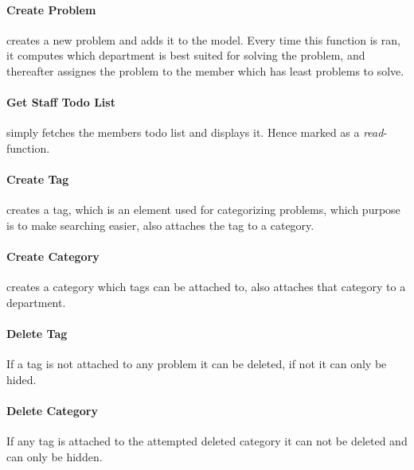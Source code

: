 \paragraph{Create Problem} creates a new problem and adds it to the model. Every time this function is ran, it computes which department is best suited for solving the problem, and thereafter assignes the problem to the \astaff[] member which has least problems to solve.  


\paragraph{Get Staff Todo List} simply fetches the \astaff[] members todo list and displays it. Hence marked as a \textit{read}-function. 

\paragraph{Create Tag} creates a tag, which is an element used for categorizing problems, which purpose is to make searching easier, also attaches the tag to a category. 

\paragraph{Create Category} creates a category which tags can be attached to, also attaches that category to a department. 

\paragraph{Delete Tag} If a tag is not attached to any problem it can be deleted, if not it can only be hided. 

\paragraph{Delete Category} If any tag is attached to the attempted deleted category it can not be deleted and can only be hidden. 

